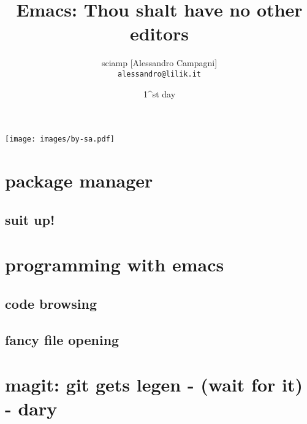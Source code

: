 \documentclass{beamer}
\title{\raisebox{-.3\height}{\texttt{[image: images/emacs.pdf]}} Emacs: Thou shalt have no other editors}
\author{sciamp [Alessandro Campagni]\\ \texttt{alessandro@lilik.it}}
\date{1^{st} \raisebox{-.4\height}{\texttt{[image: images/lilik.pdf]}} day}
\begin{document}
\begin{frame}
\titlepage
\centering
\texttt{[image: images/by-sa.pdf]}
\end{frame}

\section{package manager}

\subsection{suit up!}

\section{programming with emacs}

\subsection{code browsing}

\subsection{fancy file opening}

\section{magit: git gets legen - (wait for it) - dary}
\end{document}
